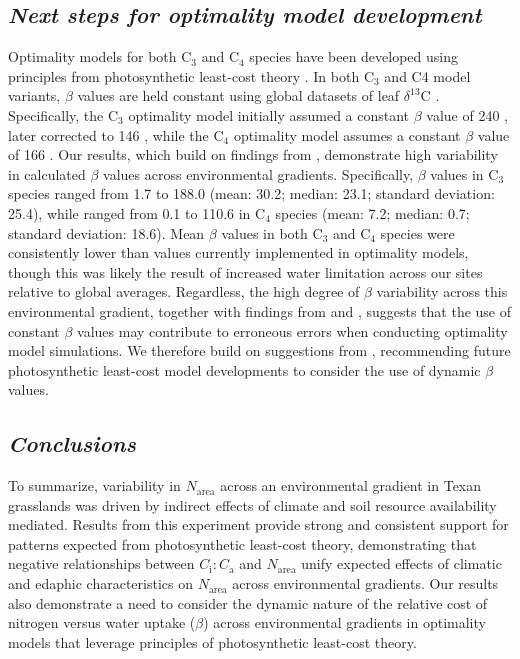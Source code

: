 \subsection{\textit{Next steps for optimality model development}}
\noindent Optimality models for both C$_3$ and C$_4$ species have been developed using principles from photosynthetic least-cost theory . In both C$_3$ and C4 model variants, $\beta$ values are held constant using global datasets of leaf $\delta^{13}$C . Specifically, the C$_3$ optimality model initially assumed a constant $\beta$ value of 240 , later corrected to 146 , while the C$_4$ optimality model assumes a constant $\beta$ value of 166 . Our results, which build on findings from , demonstrate high variability in calculated $\beta$ values across environmental gradients. Specifically, $\beta$ values in C$_3$ species ranged from 1.7 to 188.0 (mean: 30.2; median: 23.1; standard deviation: 25.4), while ranged from 0.1 to 110.6 in C$_4$ species (mean: 7.2; median: 0.7; standard deviation: 18.6). Mean $\beta$ values in both C$_3$ and C$_4$ species were consistently lower than values currently implemented in optimality models, though this was likely the result of increased water limitation across our sites relative to global averages. Regardless, the high degree of $\beta$ variability across this environmental gradient, together with findings from  and , suggests that the use of constant $\beta$ values may contribute to erroneous errors when conducting optimality model simulations. We therefore build on suggestions from , recommending future photosynthetic least-cost model developments to consider the use of dynamic $\beta$ values.

\subsection{\textit{Conclusions}}
\noindent To summarize, variability in $N_\mathrm{area}$ across an environmental gradient in Texan grasslands was driven by indirect effects of climate and soil resource availability mediated. Results from this experiment provide strong and consistent support for patterns expected from photosynthetic least-cost theory, demonstrating that negative relationships between $C_\mathrm{i}\mathrm{:}C_\mathrm{a}$ and $N_\mathrm{area}$ unify expected effects of climatic and edaphic characteristics on $N_\mathrm{area}$ across environmental gradients. Our results also demonstrate a need to consider the dynamic nature of the relative cost of nitrogen versus water uptake ($\beta$) across environmental gradients in optimality models that leverage principles of photosynthetic least-cost theory.
